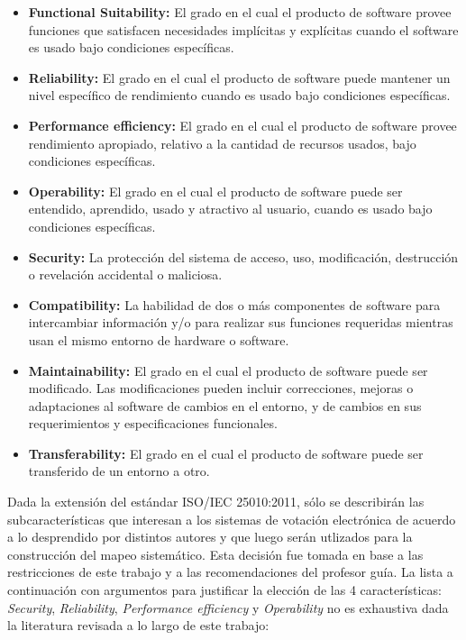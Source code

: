 \begin{itemize}
	\item \textbf{Functional Suitability:} El grado en el cual el producto de software provee funciones
		que satisfacen necesidades implícitas y explícitas cuando el software es usado bajo
		condiciones específicas.
		
	\item \textbf{Reliability:} El grado en el cual el producto de software puede mantener un nivel
		específico de rendimiento cuando es usado bajo condiciones específicas.
		 	
	\item \textbf{Performance efficiency:} El grado en el cual el producto de software provee rendimiento 
		apropiado, relativo a la cantidad de recursos usados, bajo condiciones específicas.

	\item \textbf{Operability:} El grado en el cual el producto de software puede ser entendido, aprendido, usado
		y atractivo al usuario, cuando es usado bajo condiciones específicas.

	\item \textbf{Security:} La protección del sistema de acceso, uso, modificación, destrucción o revelación
		 accidental o maliciosa.

	\item \textbf{Compatibility:} La habilidad de dos o más componentes de software para intercambiar 
		información y/o para realizar sus funciones requeridas mientras usan el mismo entorno de hardware o 
		software.
		
	\item \textbf{Maintainability:} El grado en el cual el producto de software puede ser modificado. Las modificaciones
		pueden incluir correcciones, mejoras o adaptaciones al software de cambios en el entorno, y de cambios en
		sus requerimientos y especificaciones funcionales.
		
	\item \textbf{Transferability:} El grado en el cual el producto de software puede ser transferido
		de un entorno a otro.
\end{itemize}


Dada la extensión del estándar ISO/IEC 25010:2011, sólo se describirán las
subcaracterísticas que interesan a los sistemas de votación electrónica
de acuerdo a lo desprendido por distintos autores y que luego serán utlizados para
la construcción del mapeo sistemático. Esta decisión fue tomada en base a las restricciones
de este trabajo y a las recomendaciones del profesor guía. La lista a continuación con 
argumentos para justificar la elección de las 4 características: \textit{Security}, \textit{Reliability}, 
\textit{Performance efficiency} y \textit{Operability} no es exhaustiva dada la literatura revisada a lo largo de este trabajo:

